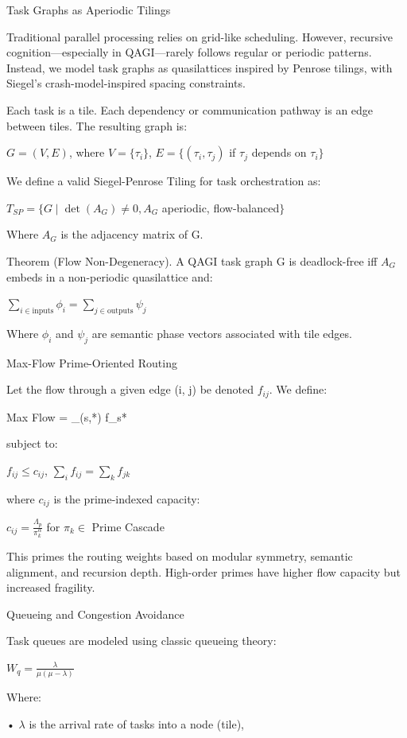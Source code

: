 \documentclass[11pt]{article}
\begin{document}
Task Graphs as Aperiodic Tilings

Traditional parallel processing relies on grid-like scheduling. However, recursive cognition—especially in QAGI—rarely follows regular or periodic patterns. Instead, we model task graphs as quasilattices inspired by Penrose tilings, with Siegel’s crash-model-inspired spacing constraints.

Each task is a tile. Each dependency or communication pathway is an edge between tiles. The resulting graph is:

$G = (V, E)$, where $V = \{\tau_i\}$, $E = \{(\tau_i, \tau_j)$ if $\tau_j$ depends on $\tau_i\}$

We define a valid Siegel-Penrose Tiling for task orchestration as:

$T_{SP} = \{G \mid \det(A_G) \neq 0, A_G$ aperiodic, flow-balanced$\}$

Where $A_G$ is the adjacency matrix of G.

Theorem (Flow Non-Degeneracy). A QAGI task graph G is deadlock-free iff $A_G$ embeds in a non-periodic quasilattice and:

$\sum_{i \in \text{inputs}} \phi_i = \sum_{j \in \text{outputs}} \psi_j$

Where $\phi_i$ and $\psi_j$ are semantic phase vectors associated with tile edges.

Max-Flow Prime-Oriented Routing

Let the flow through a given edge (i, j) be denoted $f_{ij}$. We define:

Max Flow = \max \sum_{(s,*)} f_{s*}

subject to:

$f_{ij} \leq c_{ij}$, $\sum_i f_{ij} = \sum_k f_{jk}$

where $c_{ij}$ is the prime-indexed capacity:

$c_{ij} = \frac{\Lambda_p}{\pi_k^\alpha}$ for $\pi_k \in$ Prime Cascade

This primes the routing weights based on modular symmetry, semantic alignment, and recursion depth. High-order primes have higher flow capacity but increased fragility.

Queueing and Congestion Avoidance

Task queues are modeled using classic queueing theory:

$W_q = \frac{\lambda}{\mu (\mu - \lambda)}$

Where:

• $\lambda$ is the arrival rate of tasks into a node (tile),
\end{document}
